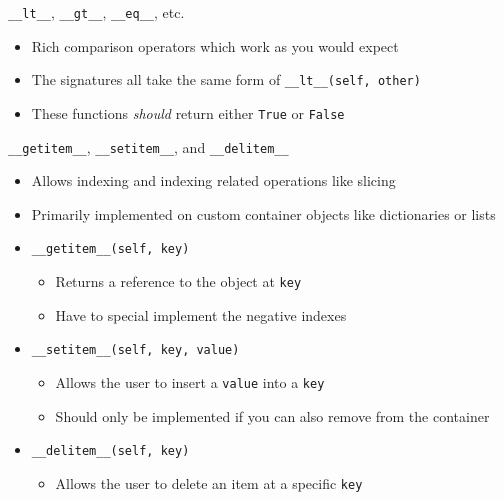 \documentclass[aspectratio=169,xcolor=dvipsnames]{beamer}
\begin{document}
\begin{frame}{\texttt{\_\_lt\_\_}, \texttt{\_\_gt\_\_}, \texttt{\_\_eq\_\_}, etc.}
  \begin{itemize}
    \item Rich comparison operators which work as you would expect
    \item The signatures all take the same form of \texttt{\_\_lt\_\_(self, other)}
    \item These functions \textit{should} return either \texttt{True} or \texttt{False}
  \end{itemize}
  \begin{example}
    
  \end{example}
\end{frame}


\begin{frame}{\texttt{\_\_getitem\_\_}, \texttt{\_\_setitem\_\_}, and \texttt{\_\_delitem\_\_}}
  \begin{itemize}
    \item Allows indexing and indexing related operations like slicing
    \item Primarily implemented on custom container objects like dictionaries or lists
    \item \texttt{\_\_getitem\_\_(self, key)}
      \begin{itemize}
        \item Returns a reference to the object at \texttt{key}
        \item Have to special implement the negative indexes
      \end{itemize}
    \item \texttt{\_\_setitem\_\_(self, key, value)}
      \begin{itemize}
        \item Allows the user to insert a \texttt{value} into a \texttt{key}
        \item Should only be implemented if you can also remove from the container
      \end{itemize}
    \item \texttt{\_\_delitem\_\_(self, key)}
      \begin{itemize}
        \item Allows the user to delete an item at a specific \texttt{key}
      \end{itemize}
  \end{itemize}
\end{frame}
\end{document}
